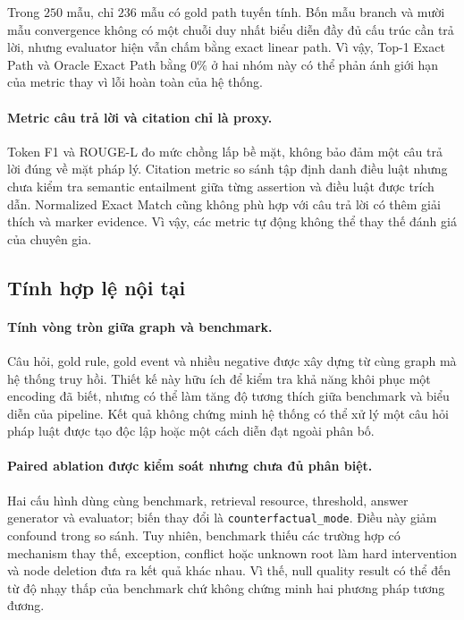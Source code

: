 Trong $250$ mẫu, chỉ $236$ mẫu có gold path tuyến tính. Bốn mẫu branch và
mười mẫu convergence không có một chuỗi duy nhất biểu diễn đầy đủ cấu trúc
cần trả lời, nhưng evaluator hiện vẫn chấm bằng exact linear path. Vì vậy,
Top-1 Exact Path và Oracle Exact Path bằng $0\%$ ở hai nhóm này có thể phản
ánh giới hạn của metric thay vì lỗi hoàn toàn của hệ thống.

\paragraph{Metric câu trả lời và citation chỉ là proxy.}

Token F1 và ROUGE-L đo mức chồng lấp bề mặt, không bảo đảm một câu trả lời
đúng về mặt pháp lý. Citation metric so sánh tập định danh điều luật nhưng
chưa kiểm tra semantic entailment giữa từng assertion và điều luật được
trích dẫn. Normalized Exact Match cũng không phù hợp với câu trả lời có thêm
giải thích và marker evidence. Vì vậy, các metric tự động không thể thay thế
đánh giá của chuyên gia.

\subsection{Tính hợp lệ nội tại}

\paragraph{Tính vòng tròn giữa graph và benchmark.}

Câu hỏi, gold rule, gold event và nhiều negative được xây dựng từ cùng graph
mà hệ thống truy hồi. Thiết kế này hữu ích để kiểm tra khả năng khôi phục một
encoding đã biết, nhưng có thể làm tăng độ tương thích giữa benchmark và
biểu diễn của pipeline. Kết quả không chứng minh hệ thống có thể xử lý một
câu hỏi pháp luật được tạo độc lập hoặc một cách diễn đạt ngoài phân bố.

\paragraph{Paired ablation được kiểm soát nhưng chưa đủ phân biệt.}

Hai cấu hình dùng cùng benchmark, retrieval resource, threshold, answer
generator và evaluator; biến thay đổi là
\texttt{counterfactual\_mode}. Điều này giảm confound trong so sánh. Tuy
nhiên, benchmark thiếu các trường hợp có mechanism thay thế, exception,
conflict hoặc unknown root làm hard intervention và node deletion đưa ra kết
quả khác nhau. Vì thế, null quality result có thể đến từ độ nhạy thấp của
benchmark chứ không chứng minh hai phương pháp tương đương.

